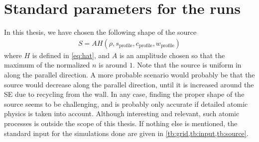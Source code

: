 \section{Standard parameters for the runs}
%
In this thesis, we have chosen the following shape of the source
%
\begin{align*}
    S = AH(\rho,s_{\text{profile}},c_{\text{profile}},w_{\text{profile}})
\end{align*}
%
where $H$ is defined in \cref{eq:hat}, and $A$ is an amplitude chosen so that the maximum of the normalized $n$ is around $1$.
Note that the source is uniform in along the parallel direction.
A more probable scenario would probably be that the source would decrease along the parallel direction, until it is increased around the SE due to recycling from the wall.
In any case, finding the proper shape of the source seems to be challenging, and is probably only accurate if detailed atomic physics is taken into account.
Although interesting and relevant, such atomic processes is outside the scope of this thesis.
If nothing else is mentioned, the standard input for the simulations done are given in \cref{tb:grid,tb:input,tb:source}.
%

